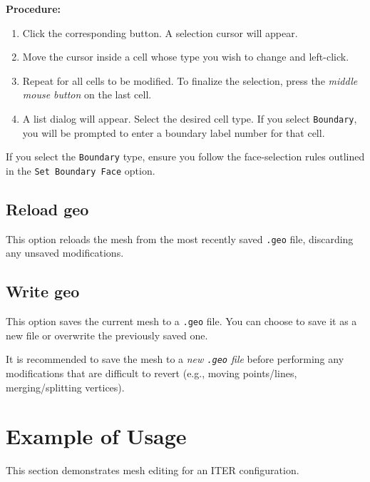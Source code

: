 \documentclass[a4paper,12pt]{article}
\begin{document}
  \textbf{Procedure:}
  \begin{enumerate}[itemsep=2pt,topsep=5pt]
    \item Click the corresponding button. A selection cursor will appear.
    \item Move the cursor inside a cell whose type you wish to change and left-click.
    \item Repeat for all cells to be modified. To finalize the selection, press the {\em middle mouse button} on the last cell.
    \item A list dialog will appear. Select the desired cell type. If you select {\tt Boundary}, you will be prompted to enter a boundary label number for that cell.
  \end{enumerate}

  \begin{importantbox}
    If you select the {\tt Boundary} type, ensure you follow the face-selection rules outlined in the {\tt Set Boundary Face} option.
  \end{importantbox}

  \subsection{Reload geo}

  This option reloads the mesh from the most recently saved {\tt .geo} file, discarding any unsaved modifications.

  \subsection{Write geo}

  This option saves the current mesh to a {\tt .geo} file. You can choose to save it as a new file or overwrite the previously saved one.

  \begin{infobox}
    It is recommended to save the mesh to a {\em new {\tt .geo} file} before performing any modifications that are difficult to revert (e.g., moving points/lines, merging/splitting vertices).
  \end{infobox}

  \section{Example of Usage}

  This section demonstrates mesh editing for an ITER configuration. \\
\end{document}

